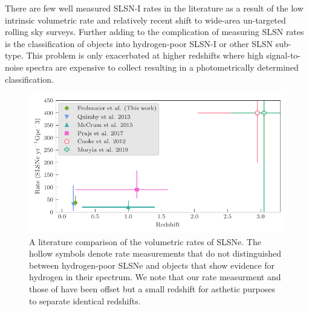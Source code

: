 \documentclass[a4paper,fleqn,usenatbib]{mnras}
\begin{document}
There are few well measured SLSN-I rates in the literature as a result of the low intrinsic volumetric rate and relatively recent shift to wide-area un-targeted rolling sky surveys. Further adding to the complication of measuring SLSN rates is the classification of objects into hydrogen-poor SLSN-I or other SLSN sub-type. This problem is only exacerbated at higher redshifts where high signal-to-noise spectra are expensive to collect resulting in a photometrically determined classification.

\begin{figure}
	\includegraphics[width=\linewidth]{./SLSN_Compare_Literature.pdf}
    \caption{A literature comparison of the volumetric rates of SLSNe. The hollow symbols denote rate measurements that do not distinguished between hydrogen-poor SLSNe and objects that show evidence for hydrogen in their spectrum. We note that our rate measurment and those of \citet{Quimby2013,Cooke2012,2019ApJS..241...16M} have been offset but a small redshift for asthetic purposes to separate identical redshifts. }
    \label{fig:rates_SLSN_Lit}
\end{figure}
\end{document}
